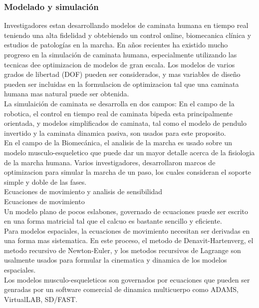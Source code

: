 \documentclass[10pt,onecolumn,twoside,letterpaper]{article}
\begin{document}
\subsubsection{Modelado y simulaci\'on}
Investigadores estan desarrollando modelos de caminata humana en tiempo real teniendo una alta fidelidad y obtebiendo un control online, biomecanica cl\'inica y estudios de patolog\'ias en la marcha. En a\~nos recientes ha existido mucho progreso en la simulaci\'on de caminata humana, especialmente utilizando las tecnicas dee optimizacion de modelos de gran escala. Los modelos de varios grados de libertad (DOF) pueden ser considerados, y mas variables de dise\~no pueden ser incluidas en la formulacion de optimizacion tal que una caminata humana mas natural puede ser obtenida.\cite{Xiang2010}\\
La simulaici\'on de caminata se desarrolla en dos campos:
En el campo de la robotica, el control en tiempo real de caminata bipeda esta principalmente orientada, y modelos simplificados de caminata, tal como el modelo de pendulo invertido y la caminata dinamica pasiva, son usados para este proposito.\\
En el campo de la Biomec\'anica, el analisis de la marcha es usado sobre un modelo musculo-esqueletico que puede dar un mayor detalle acerca de la fisiologia de la marcha humana. Varios investigadores, desarrollaron marcos de optimizacion para simular la marcha de un paso, los cuales consideran el soporte simple y doble de las fases.\cite{Xiang2010}\\
Ecuaciones de movimiento y analisis de sensibilidad\\
Ecuaciones de movimiento\\
Un modelo plano de pocos eslabones, governado de ecuaciones puede ser escrito en una forma matricial tal que el calcuo es bastante sencillo y eficiente.\\
Para modelos espaciales, la ecuaciones de movimiento necesitan ser derivadas en una forma mas sistematica. En este proceso, el metodo de Denavit-Hartenverg, el metodo recursivo de Newton-Euler, y los metodos recursivos de Lagrange son usalmente usados para formular la cinematica y dinamica de los modelos espaciales.\\
Los modelos musculo-esqueleticos son governados por ecuaciones que pueden ser genradas por un software comercial de dinamica multicuerpo como ADAMS, VirtualLAB, SD/FAST.\cite{Xiang2010}\\
\end{document}
